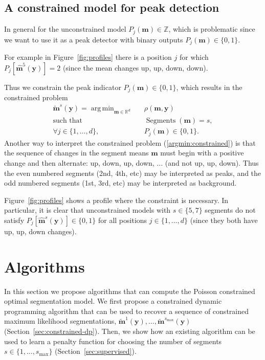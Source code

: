 \documentclass{article}
\DeclareMathOperator*{\argmin}{arg\,min}
\DeclareMathOperator*{\Segments}{Segments}
\newcommand{\ZZ}{\mathbb Z}
\newcommand{\RR}{\mathbb R}
\begin{document}
\subsection{A constrained model for peak detection}

In general for the unconstrained model $P_j(\mathbf m)\in\ZZ$, which
is problematic since we want to use it as a peak detector with binary
outputs $P_j(\mathbf m)\in \{0, 1\}$. 

For example in Figure~\ref{fig:profiles} there is a position $j$ for
which $P_j\left[ \mathbf{\hat m}^5(\mathbf y) \right]=2$ (since the
mean changes up, up, down, down). 

Thus we constrain the peak indicator $P_j(\mathbf
m)\in\{0, 1\}$, which results
in the constrained problem
\begin{eqnarray}
  \label{argmin:constrained}
  \mathbf{\tilde m}^s(\mathbf y)  =
    \argmin_{\mathbf m\in\RR^{d}} && 
    \rho(\mathbf m, \mathbf y) \\
    \text{such that} && \Segments(\mathbf m)=s, \nonumber \\
     \forall j\in\{1, \dots, d\}, &&P_j(\mathbf m) \in\{0, 1\}.
     \nonumber
\end{eqnarray}
Another way to interpret the constrained problem
(\ref{argmin:constrained}) is that the sequence of changes in the
segment means $\mathbf m$ must begin with a positive change and then
alternate: up, down, up, down, ... (and not up, up, down). Thus the
even numbered segments (2nd, 4th, etc) may be interpreted as peaks,
and the odd numbered segments (1st, 3rd, etc) may be interpreted as
background. 

Figure~\ref{fig:profiles} shows a profile where the constraint is
necessary. In particular, it is clear that unconstrained models with
$s\in\{5, 7\}$ segments do not satisfy $P_j[\mathbf{\hat m}^s(\mathbf
y)]\in\{0, 1\}$ for all positions $j\in\{1,\dots, d\}$ (since they
both have up, up, down changes).

\section{Algorithms}

In this section we propose algorithms that can compute the Poisson
constrained optimal segmentation model. We first propose a constrained
dynamic programming algorithm that can be used to recover a sequence
of constrained maximum likelihood segmentations, $\mathbf{\tilde
  m}^1(\mathbf y), \dots, \mathbf{\tilde m}^{s_{\text{max}}}(\mathbf
y)$ (Section~\ref{sec:constrained-dp}). Then, we show how an existing
algorithm can be used to learn a penalty function for choosing the
number of segments $s\in\{1, \dots, s_{\text{max}}\}$
(Section~\ref{sec:supervised}).
\end{document}
